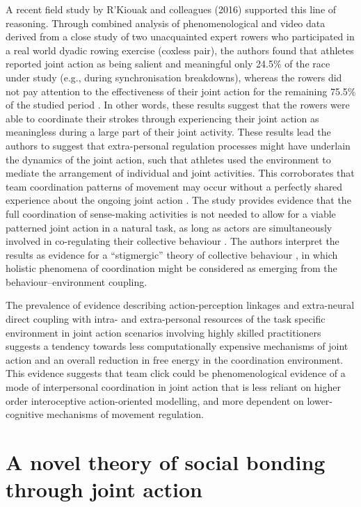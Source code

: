 \begin{CJK}{UTF8}{gbsn}
A recent field study by R'Kiouak and colleagues (2016) supported this line of reasoning.  Through combined analysis of phenomenological and video data derived from a close study of two unacquainted expert rowers who participated in a real world dyadic rowing exercise (coxless pair), the authors found that athletes reported joint action as being salient and meaningful only 24.5\% of the race under study (e.g., during synchronisation breakdowns), whereas the rowers did not pay attention to the effectiveness of their joint action for the remaining 75.5\% of the studied period \citep{RKiouak2016}.  In other words, these results suggest that the rowers were able to coordinate their strokes through experiencing their joint action as meaningless during a large part of their joint activity.  These results lead the authors to suggest that extra-personal regulation processes might have underlain the dynamics of the joint action, such that athletes used the environment to mediate the arrangement of individual and joint activities. This corroborates that team coordination patterns of movement may occur without a perfectly shared experience about the ongoing joint action \citep{Bourbousson2011,Bourbousson2012}. The study provides evidence that the full coordination of sense-making activities is not needed to allow for a viable patterned joint action in a natural task, as long as actors are simultaneously involved in co-regulating their collective behaviour \citep{Froese2011,Froese2014}.
The authors interpret the results as evidence for a ``stigmergic'' theory of collective behaviour  \citep{Susi2001,Avvenuti2013}, in which holistic phenomena of coordination might be considered as emerging from the behaviour–environment coupling.

The prevalence of evidence describing action-perception linkages and extra-neural direct coupling with intra- and extra-personal resources of the task specific environment in joint action scenarios involving highly skilled practitioners suggests a tendency towards less computationally expensive mechanisms of joint action and an overall reduction in free energy in the coordination environment.  This evidence suggests that team click could be phenomenological evidence of a mode of interpersonal coordination in joint action that is less reliant on higher order interoceptive action-oriented modelling, and more dependent on lower-cognitive mechanisms of movement regulation.






\section{A novel theory of social bonding through joint action}


\end{CJK}
